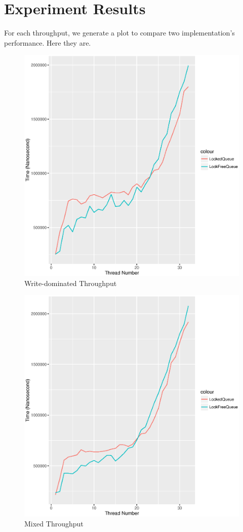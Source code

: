 \documentclass[a4paper]{report}
\begin{document}
\section*{Experiment Results}
For each throughput, we generate a plot to compare two implementation's performance. Here they are.

\begin{figure}[H]
  \includegraphics[scale=0.8]{result/result-tacc-7857629-write}
  \caption{Write-dominated Throughput}
\end{figure}

\begin{figure}[H]
  \includegraphics[scale=0.8]{result/result-tacc-7857629-mixed}
  \caption{Mixed Throughput}
\end{figure}
\end{document}

